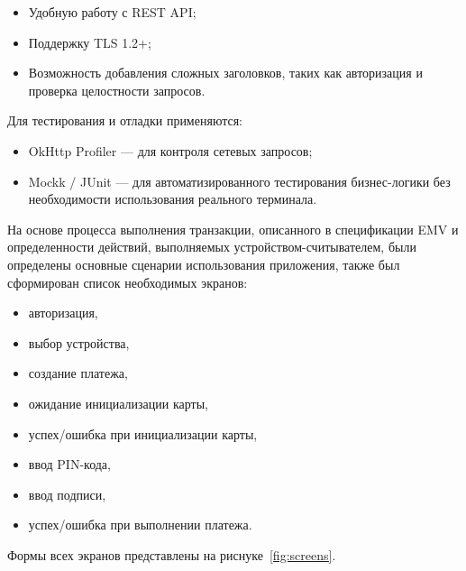 \begin{itemize}
    \item Удобную работу с REST API;
    \item Поддержку TLS 1.2+;
    \item Возможность добавления сложных заголовков, таких как авторизация и проверка целостности запросов.
\end{itemize}

Для тестирования и отладки применяются:

\begin{itemize}
    \item OkHttp Profiler — для контроля сетевых запросов;
    \item Mockk / JUnit — для автоматизированного тестирования бизнес-логики без необходимости использования реального терминала.
\end{itemize}


На основе процесса выполнения транзакции, описанного в спецификации EMV и определенности действий, выполняемых устройством-считывателем, были определены основные сценарии использования приложения, также был сформирован список необходимых экранов:
\begin{itemize}
    \item авторизация,
    \item выбор устройства,
    \item создание платежа,
    \item ожидание инициализации карты,
    \item успех/ошибка при инициализации карты,
    \item ввод PIN-кода,
    \item ввод подписи,
    \item успех/ошибка при выполнении платежа.
\end{itemize}

Формы всех экранов представлены на риснуке~\ref{fig:screens}.

